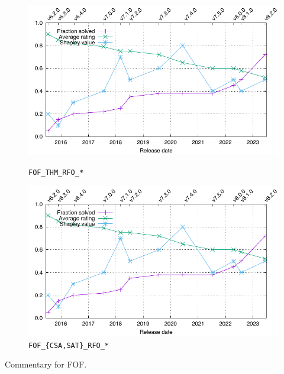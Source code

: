 \documentclass[runningheads]{llncs}
\begin{document}
\begin{figure}[ht!]
\centering
\begin{minipage}[t]{.49\textwidth}
  \centering
  \includegraphics[width=\textwidth]{Plots/GNUPlots/TestData.pdf}
  \vspace*{-2em}
  \caption{{\tt FOF\_THM\_RFO\_*}}
  \label{Plot_FOF_THM}
\end{minipage}
\begin{minipage}[t]{.49\textwidth}
  \centering
  \includegraphics[width=\textwidth]{Plots/GNUPlots/TestData.pdf}
  \vspace*{-2em}
  \caption{{\tt FOF\_\{CSA,SAT\}\_RFO\_*}}
  \label{Plot_FOF_SAT}
\end{minipage}
\end{figure}

Commentary for FOF.
\end{document}
